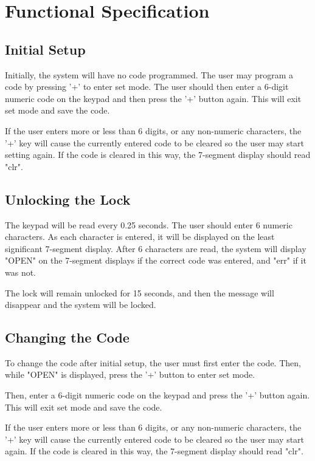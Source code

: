 \documentclass[11pt]{article}
\begin{document}
\section{Functional Specification}

\subsection{Initial Setup}

Initially, the system will have no code programmed. The user may program a code by pressing '+' to enter set mode. The user should then enter a 6-digit numeric code on the keypad and then press the '+' button again. This will exit set mode and save the code.

If the user enters more or less than 6 digits, or any non-numeric characters, the '+' key will cause the currently entered code to be cleared so the user may start setting again. If the code is cleared in this way, the 7-segment display should read "clr".

\subsection{Unlocking the Lock}

The keypad will be read every 0.25 seconds. The user should enter 6 numeric characters. As each character is entered,  it will be displayed on the least significant 7-segment display. After 6 characters are read, the system will display "OPEN" on the 7-segment displays if the correct code was entered, and "err" if it was not.

The lock will remain unlocked for 15 seconds, and then the message will disappear and the system will be locked.

\subsection{Changing the Code}

To change the code after initial setup, the user must first enter the code. Then, while "OPEN" is displayed, press the '+' button to enter set mode.

Then, enter a 6-digit numeric code on the keypad and press the '+' button again. This will exit set mode and save the code.

If the user enters more or less than 6 digits, or any non-numeric characters, the '+' key will cause the currently entered code to be cleared so the user may start again. If the code is cleared in this way, the 7-segment display should read "clr".
\end{document}
